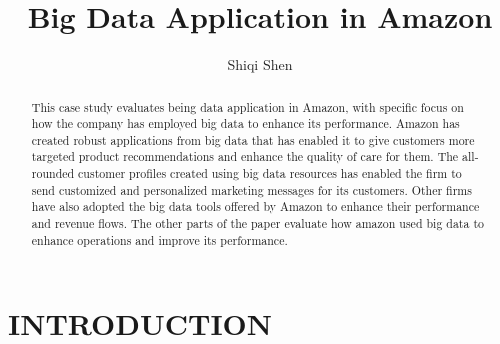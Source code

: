 \documentclass[sigconf]{acmart}
\begin{document}
\title{Big Data Application in Amazon}

\author{Shiqi Shen}

\begin{abstract}

This case study evaluates being data application in Amazon, with specific focus on how the company has employed big data to enhance its performance. Amazon has created robust applications from big data that has enabled it to give customers more targeted product recommendations and enhance the quality of care for them. The all-rounded customer profiles created using big data resources has enabled the firm to send customized and personalized marketing messages for its customers. Other firms have also adopted the big data tools offered by Amazon to enhance their performance and revenue flows. The other parts of the paper evaluate how amazon used big data to enhance operations and improve its performance. 
    
\end{abstract}


\maketitle

\section{INTRODUCTION}
\end{document}
